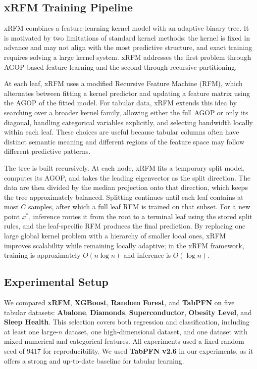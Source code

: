 \subsection{xRFM Training Pipeline}

xRFM combines a feature-learning kernel model with an adaptive binary tree. It is motivated by two limitations of standard kernel methods: the kernel is fixed in advance and may not align with the most predictive structure, and exact training requires solving a large kernel system. xRFM addresses the first problem through AGOP-based feature learning and the second through recursive partitioning.

At each leaf, xRFM uses a modified Recursive Feature Machine (RFM), which alternates between fitting a kernel predictor and updating a feature matrix using the AGOP of the fitted model. For tabular data, xRFM extends this idea by searching over a broader kernel family, allowing either the full AGOP or only its diagonal, handling categorical variables explicitly, and selecting bandwidth locally within each leaf. These choices are useful because tabular columns often have distinct semantic meaning and different regions of the feature space may follow different predictive patterns.

The tree is built recursively. At each node, xRFM fits a temporary split model, computes its AGOP, and takes the leading eigenvector as the split direction. The data are then divided by the median projection onto that direction, which keeps the tree approximately balanced. Splitting continues until each leaf contains at most \(C\) samples, after which a full leaf RFM is trained on that subset. For a new point \(x^{*}\), inference routes it from the root to a terminal leaf using the stored split rules, and the leaf-specific RFM produces the final prediction. By replacing one large global kernel problem with a hierarchy of smaller local ones, xRFM improves scalability while remaining locally adaptive; in the xRFM framework, training is approximately \(O(n \log n)\) and inference is \(O(\log n)\).

\subsection{Experimental Setup}

We compared \textbf{xRFM}, \textbf{XGBoost}, \textbf{Random Forest}, and \textbf{TabPFN} on five tabular datasets: \textbf{Abalone}, \textbf{Diamonds}, \textbf{Superconductor}, \textbf{Obesity Level}, and \textbf{Sleep Health}. This selection covers both regression and classification, including at least one large-$n$ dataset, one high-dimensional dataset, and one dataset with mixed numerical and categorical features. All experiments used a fixed random seed of 9417 for reproducibility. We used \textbf{TabPFN v2.6} in our experiments, as it offers a strong and up-to-date baseline for tabular learning.

